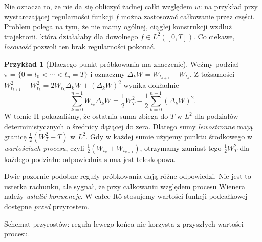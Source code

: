 \documentclass[11pt,a4paper,oneside]{report}
\numberwithin{equation}{chapter}
\theoremstyle{plain}
\theoremstyle{definition}
\newtheorem{przyklad}{Przykład}[chapter]
\theoremstyle{remark}
\begin{document}
Nie oznacza to, że nie da się obliczyć żadnej całki względem $w$:
na przykład przy wystarczającej regularności funkcji $f$ można
zastosować całkowanie przez części. Problem polega na tym,
że nie mamy ogólnej, ciągłej konstrukcji wzdłuż trajektorii,
która działałaby dla dowolnego $f\in L^2([0,T])$.
Co ciekawe, \emph{losowość} pozwoli ten brak regularności pokonać.

\begin{przyklad}[Dlaczego punkt próbkowania ma znaczenie]
Weźmy podział $\pi=\{0=t_0<\cdots<t_n=T\}$ i oznaczmy
$\Delta_kW=W_{t_{k+1}}-W_{t_k}$. Z tożsamości
$W_{t_{k+1}}^2-W_{t_k}^2=2W_{t_k}\Delta_kW+(\Delta_kW)^2$
wynika dokładnie
\[
\sum_{k=0}^{n-1}W_{t_k}\Delta_kW
=\frac12W_T^2-\frac12\sum_{k=0}^{n-1}(\Delta_kW)^2.
\]
W tomie II pokazaliśmy, że ostatnia suma zbiega do $T$ w $L^2$
dla podziałów deterministycznych o średnicy dążącej do zera.
Dlatego sumy \emph{lewostronne} mają granicę
$\frac12(W_T^2-T)$ w $L^2$. Gdy w każdej sumie użyjemy
punktu środkowego w \emph{wartościach procesu}, czyli
$\frac12(W_{t_k}+W_{t_{k+1}})$, otrzymamy zamiast tego
$\frac12W_T^2$ dla każdego podziału: odpowiednia suma
jest teleskopowa.

Dwie pozornie podobne reguły próbkowania dają różne odpowiedzi.
Nie jest to usterka rachunku, ale sygnał, że przy całkowaniu względem
procesu Wienera należy \emph{ustalić konwencję}. W całce Itô
stosujemy wartości funkcji podcałkowej dostępne \emph{przed} przyrostem.
\end{przyklad}

\begin{center}
\par\smallskip\small Schemat przyrostów: reguła lewego końca nie korzysta z przyszłych wartości procesu.
\end{center}
\end{document}
